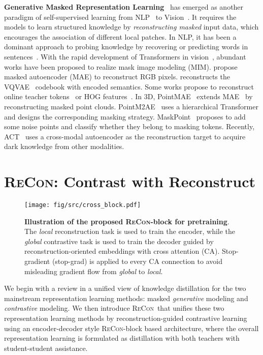 \documentclass{article}
\theoremstyle{plain}
\theoremstyle{definition}
\theoremstyle{remark}
\def\recon{{\scshape ReCon}}
\begin{document}
\textbf{Generative Masked Representation Learning}~ 
has emerged as another paradigm of self-supervised learning from NLP~\citep{BERT} to Vision~\citep{MAE}.
It requires the models to learn structured knowledge by \textit{reconstructing masked} input data, which encourages the association of different local patches.
In NLP, it has been a dominant approach to probing knowledge by recovering or predicting words in sentences~\citep{BERT,GPT3_20}. 
With the rapid development of Transformers in vision~\citep{ViT,SwinT}, abundant works have been proposed to realize mask image modeling (MIM). 
\citet{MAE} propose masked autoencoder (MAE) to reconstruct RGB pixels. 
\citet{BEiT} reconstructs the VQVAE~\citep{DALL-E} codebook with encoded semantics. 
Some works propose to reconstruct online teacher tokens~\citep{iBoT} or HOG features~\citep{MaskFeat}. 
In 3D, PointMAE~\citep{PointMAE} extends MAE~\citep{MAE} by reconstructing masked point clouds. PointM2AE~\citep{PointM2AE22} uses a hierarchical Transformer and designs the corresponding masking strategy. MaskPoint~\citep{MaskPoint} proposes to add some noise points and classify whether they belong to masking tokens. Recently, ACT~\citep{ACT23} uses a cross-modal autoencoder as the reconstruction target to acquire dark knowledge from other modalities.  \section{\recon : Contrast with Reconstruct}\label{sec:method}
\begin{figure}[t!]
    \begin{center}
    \texttt{[image: fig/src/cross\_block.pdf]}
    \vspace{-5pt}
    \caption{\textbf{Illustration of the proposed \recon-block for pretraining}. The \textit{local} reconstruction task is used to train the encoder, while the \textit{global} contrastive task is used to train the decoder guided by reconstruction-oriented embeddings with cross attention (CA). Stop-gradient (stop-grad) is applied to every CA connection to avoid misleading gradient flow from \textit{global} to \textit{local}.}\label{fig:recon_block}
    \end{center}
    \vspace{-10pt}
\end{figure} We begin with a review in a unified view of knowledge distillation for the two mainstream representation learning methods: masked \textit{generative} modeling and \textit{contrastive} modeling. We then introduce \recon~that unifies these two representation learning methods by reconstruction-guided contrastive learning using an encoder-decoder style \recon-block based architecture, where the overall representation learning is formulated as distillation with both teachers with student-student assistance.
\end{document}
